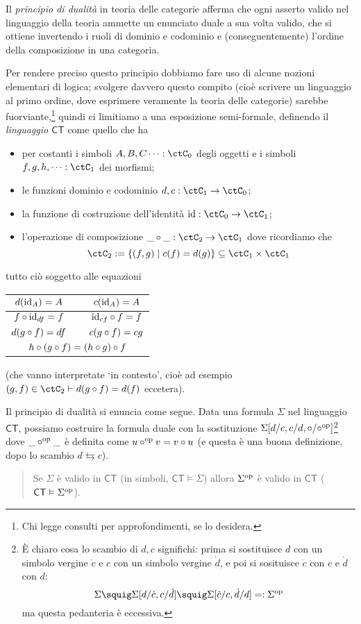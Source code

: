 \begin{proposition}
	Il \emph{principio di dualità} in teoria delle categorie afferma che ogni asserto valido nel linguaggio della teoria ammette un enunciato duale a sua volta valido, che si ottiene invertendo i ruoli di dominio e codominio e (conseguentemente) l'ordine della composizione in una categoria.

	Per rendere preciso questo principio dobbiamo fare uso di alcune nozioni elementari di logica; svolgere davvero questo compito (cioè scrivere un linguaggio al primo ordine, dove esprimere veramente la teoria delle categorie) sarebbe fuorviante,\footnote{Chi legge consulti \cite{ETCC} per approfondimenti, se lo desidera.} quindi ci limitiamo a una esposizione semi-formale, definendo il \emph{linguaggio \(\mathsf{CT}\)} come quello che ha
	\begin{itemize}
		\item per costanti i simboli \(A,B,C\dots : \ctC_0\) degli oggetti e i simboli \(f,g,h,\dots : \ctC_1\) dei morfismi;
		\item le funzioni dominio e codominio \(d,c : \ctC_1\to\ctC_0\);
		\item la funzione di costruzione dell'identità \(\id : \ctC_0\to \ctC_1\);
		\item l'operazione di composizione \(\_\cmp\_ : \ctC_2 \to \ctC_1\) dove ricordiamo che
		      \[\ctC_2 := \{(f,g)\mid c(f) = d(g)\}\subseteq\ctC_1\times\ctC_1\]
	\end{itemize}
	tutto ciò soggetto alle equazioni
	\begin{center}
		\begin{tabular}{ccc}
			\(d(\mathrm{id}_A)=A\)       &  & \(c(\mathrm{id}_A)=A\)       \\\midrule
			\(f\circ \mathrm{id}_{df}=f\) &  & \(\mathrm{id}_{cf}\circ f=f\) \\\midrule
			\(d(g\circ f)=df\)    &  & \(c(g\circ f)=cg\)    \\\midrule
			\multicolumn{3}{c}{\(h\circ (g\circ f)=(h\circ g)\circ f\)}
		\end{tabular}
	\end{center}
	(che vanno interpretate `in contesto', cioè ad esempio \((g,f) \in \ctC_2\vdash d(g\cmp f)=d(f)\) eccetera).

	Il principio di dualità si enuncia come segue.
	Data una formula \(\Sigma\) nel linguaggio \(\mathsf{CT}\), possiamo costruire la formula duale con la sostituzione \(\Sigma[d/c,c/d,\circ/\circ^{\text{op}}]\)\footnote{\`E chiaro cosa lo scambio di \(d,c\) significhi: prima si sostituisce \(d\) con un simbolo vergine \(\dot c\) e \(c\) con un simbolo vergine \(\dot d\), e poi si sosituisce \(\dot c\) con \(c\) e \(\dot d\) con \(d\):
		\[\Sigma \squig \Sigma[d/\dot c,c/\dot d]\squig \Sigma[\dot c/c,\dot d/d] =:\Sigma^\op\]
		ma questa pedanteria è eccessiva.} dove \(\_\circ^{\text{op}}\_\) è definita come \(u\circ^{\text{op}} v = v\circ u\) (e questa è una buona definizione, dopo lo scambio \(d\leftrightarrows c\)).
	\begin{quote}%
		Se \(\Sigma\) è valido in \(\mathsf{CT}\) (in simboli, \(\mathsf{CT}\vDash \Sigma\)) allora \(\Sigma^{\text{op}}\) è valido in \(\mathsf{CT}\) (\(\mathsf{CT}\vDash \Sigma^{\text{op}}\)).
	\end{quote}
\end{proposition}
